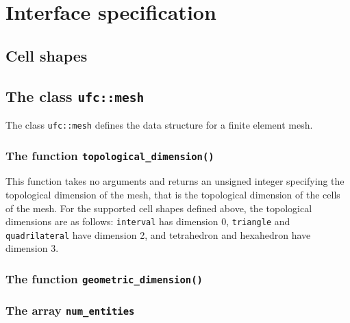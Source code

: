 \chapter{Interface specification}
\label{sec:interface}



\section{Cell shapes}


\section{The class \texttt{ufc::mesh}}

The class \texttt{ufc::mesh} defines the data structure for a finite element mesh.



\subsection{The function \texttt{topological\_dimension()}}

This function takes no arguments and returns an unsigned integer
specifying the topological dimension of the mesh, that is the
topological dimension of the cells of the mesh. For the supported
cell shapes defined above, the topological dimensions are as follows:
\texttt{interval} has dimension 0, \texttt{triangle} and
\texttt{quadrilateral} have dimension 2, and tetrahedron and
hexahedron have dimension 3.

\subsection{The function \texttt{geometric\_dimension()}}


\subsection{The array \texttt{num\_entities}}


